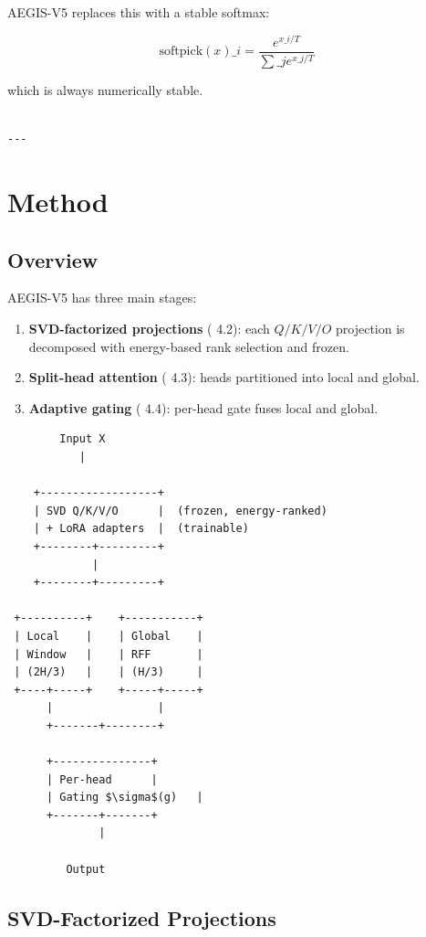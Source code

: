 AEGIS-V5 replaces this with a stable softmax:

\[
\text{softpick}(x)\_i = \frac{e^{x\_i / T}}{\sum\_j e^{x\_j / T}}
\]

which is always numerically stable.
\begin{lstlisting}

---
\end{lstlisting}

\section{Method}

\subsection{Overview}

AEGIS-V5 has three main stages:

\begin{enumerate}
\item \textbf{SVD-factorized projections} ( 4.2): each $Q/K/V/O$ projection is
  decomposed with energy-based rank selection and frozen.
\item \textbf{Split-head attention} ( 4.3): heads partitioned into local and global.
\item \textbf{Adaptive gating} ( 4.4): per-head gate fuses local and global.

\end{enumerate}
\begin{lstlisting}
        Input X
           |
            
    +------------------+
    | SVD Q/K/V/O      |  (frozen, energy-ranked)
    | + LoRA adapters  |  (trainable)
    +--------+---------+
             |
    +--------+---------+
                        
 +----------+    +-----------+
 | Local    |    | Global    |
 | Window   |    | RFF       |
 | (2H/3)   |    | (H/3)     |
 +----+-----+    +-----+-----+
      |                |
      +-------+--------+
               
      +---------------+
      | Per-head      |
      | Gating $\sigma$(g)   |
      +-------+-------+
              |
               
         Output
\end{lstlisting}

\subsection{SVD-Factorized Projections}


